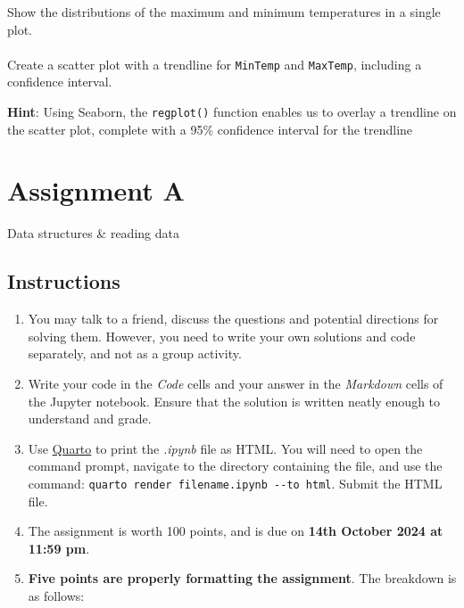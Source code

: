 \documentclass[
  letterpaper,
  DIV=11,
  numbers=noendperiod]{scrreprt}
\begin{document}
Show the distributions of the maximum and minimum temperatures in a
single plot.

\hypertarget{section-48}{%
\subsubsection{}\label{section-48}}

Create a scatter plot with a trendline for \texttt{MinTemp} and
\texttt{MaxTemp}, including a confidence interval.

\textbf{Hint}: Using Seaborn, the \texttt{regplot()} function enables us
to overlay a trendline on the scatter plot, complete with a 95\%
confidence interval for the trendline

\cleardoublepage
{}
{}
\appendix

\hypertarget{assignment-a}{%
\chapter{Assignment A}\label{assignment-a}}

Data structures \& reading data

\hfill\break

\hypertarget{instructions-2}{%
\section*{Instructions}\label{instructions-2}}


\begin{enumerate}
\def\labelenumi{\arabic{enumi}.}
\item
  You may talk to a friend, discuss the questions and potential
  directions for solving them. However, you need to write your own
  solutions and code separately, and not as a group activity.
\item
  Write your code in the \emph{Code} cells and your answer in the
  \emph{Markdown} cells of the Jupyter notebook. Ensure that the
  solution is written neatly enough to understand and grade.
\item
  Use
  \href{https://quarto.org/docs/output-formats/html-basics.html}{Quarto}
  to print the \emph{.ipynb} file as HTML. You will need to open the
  command prompt, navigate to the directory containing the file, and use
  the command: \texttt{quarto\ render\ filename.ipynb\ -\/-to\ html}.
  Submit the HTML file.
\item
  The assignment is worth 100 points, and is due on \textbf{14th October
  2024 at 11:59 pm}.
\item
  \textbf{Five points are properly formatting the assignment}. The
  breakdown is as follows:
\end{enumerate}
\end{document}
